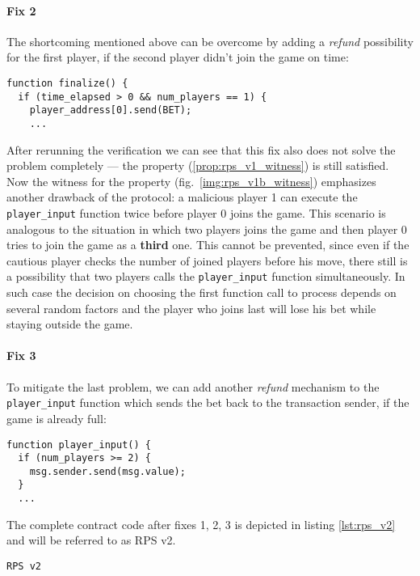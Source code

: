 \documentclass{article}
\begin{document}
\paragraph{Fix 2}

The shortcoming mentioned above can be overcome by adding a \emph{refund} possibility for the first player, if the second player
didn't join the game on time:
\begin{lstlisting}
function finalize() {
  if (time_elapsed > 0 && num_players == 1) {
    player_address[0].send(BET);
    ...
\end{lstlisting}

After rerunning the verification we can see that this fix also does not solve the problem completely --- the property 
(\ref{prop:rps_v1_witness}) is still satisfied.
Now the witness for the property (fig.\ \ref{img:rps_v1b_witness}) emphasizes another drawback of the protocol:
a malicious player 1 can execute the \lstinline{player_input} function twice before player 0 joins the game.
This scenario is analogous to the situation in which two players joins the game and then player 0 tries to join
the game as a \textbf{third} one.
This cannot be prevented, since even if the cautious player checks the number of joined players before his move,
there still is a possibility that two players calls the \lstinline{player_input} function simultaneously.
In such case the decision on choosing the first function call to process depends on several random factors and the player
who joins last will lose his bet while staying outside the game.

\paragraph{Fix 3}

To mitigate the last problem, we can add another \emph{refund} mechanism to the \lstinline{player_input} function
which sends the bet back to the transaction sender, if the game is already full:
\begin{lstlisting}
function player_input() {
  if (num_players >= 2) {
    msg.sender.send(msg.value);
  }
  ...
\end{lstlisting}

The complete contract code after fixes 1, 2, 3 is depicted in listing \ref{lst:rps_v2} and will be referred to as RPS v2.

%
\begin{lstlisting}[caption=RPS v2, label=lst:rps_v2]
RPS v2
\end{lstlisting}
\end{document}
